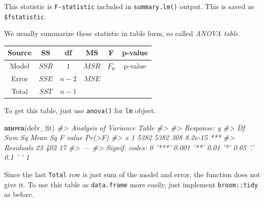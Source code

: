 \documentclass[]{book}
\newenvironment{Shaded}{\begin{snugshade}}{\end{snugshade}}
\newcommand{\CommentTok}[1]{\textcolor[rgb]{0.56,0.35,0.01}{\textit{#1}}}
\newcommand{\KeywordTok}[1]{\textcolor[rgb]{0.13,0.29,0.53}{\textbf{#1}}}
\newcommand{\NormalTok}[1]{#1}
\newcommand{\OperatorTok}[1]{\textcolor[rgb]{0.81,0.36,0.00}{\textbf{#1}}}
\newcommand{\StringTok}[1]{\textcolor[rgb]{0.31,0.60,0.02}{#1}}
\theoremstyle{definition}
\theoremstyle{definition}
\theoremstyle{definition}
\theoremstyle{remark}
\begin{document}
This statistic is \texttt{F-statistic} included in \texttt{summary.lm()} output. This is saved as \texttt{\$fstatistic}.

\begin{Shaded}
\end{Shaded}

We usually summarize these statistic in table form, so called \emph{ANOVA table}.

\begin{longtable}[]{@{}cccccc@{}}
\toprule
Source & SS & df & MS & F & p-value\tabularnewline
\midrule
\endhead
Model & \(SSR\) & \(1\) & \(MSR\) & \(F_0\) & p-value\tabularnewline
Error & \(SSE\) & \(n - 2\) & \(MSE\) & &\tabularnewline
Total & \(SST\) & \(n - 1\) & & &\tabularnewline
\bottomrule
\end{longtable}

To get this table, just use \texttt{anova()} for \texttt{lm} object.

\begin{Shaded}
\begin{Highlighting}[]
\KeywordTok{anova}\NormalTok{(delv_fit)}
\CommentTok{#> Analysis of Variance Table}
\CommentTok{#> }
\CommentTok{#> Response: y}
\CommentTok{#>           Df Sum Sq Mean Sq F value  Pr(>F)    }
\CommentTok{#> x          1   5382    5382     308 8.2e-15 ***}
\CommentTok{#> Residuals 23    402      17                    }
\CommentTok{#> ---}
\CommentTok{#> Signif. codes:  0 '***' 0.001 '**' 0.01 '*' 0.05 '.' 0.1 ' ' 1}
\end{Highlighting}
\end{Shaded}

Since the last \texttt{Total} row is just sum of the model and error, the function does not give it. To use this table as \texttt{data.frame} more easily, just implement \texttt{broom::tidy} as before.

\begin{Shaded}
\end{Shaded}
\end{document}
